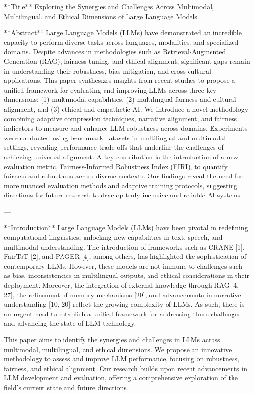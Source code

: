 **Title**  
Exploring the Synergies and Challenges Across Multimodal, Multilingual, and Ethical Dimensions of Large Language Models  

**Abstract**  
Large Language Models (LLMs) have demonstrated an incredible capacity to perform diverse tasks across languages, modalities, and specialized domains. Despite advances in methodologies such as Retrieval-Augmented Generation (RAG), fairness tuning, and ethical alignment, significant gaps remain in understanding their robustness, bias mitigation, and cross-cultural applications. This paper synthesizes insights from recent studies to propose a unified framework for evaluating and improving LLMs across three key dimensions: (1) multimodal capabilities, (2) multilingual fairness and cultural alignment, and (3) ethical and empathetic AI. We introduce a novel methodology combining adaptive compression techniques, narrative alignment, and fairness indicators to measure and enhance LLM robustness across domains. Experiments were conducted using benchmark datasets in multilingual and multimodal settings, revealing performance trade-offs that underline the challenges of achieving universal alignment. A key contribution is the introduction of a new evaluation metric, Fairness-Informed Robustness Index (FIRI), to quantify fairness and robustness across diverse contexts. Our findings reveal the need for more nuanced evaluation methods and adaptive training protocols, suggesting directions for future research to develop truly inclusive and reliable AI systems.

---

**Introduction**  
Large Language Models (LLMs) have been pivotal in redefining computational linguistics, unlocking new capabilities in text, speech, and multimodal understanding. The introduction of frameworks such as CRANE [1], FairToT [2], and PAGER [4], among others, has highlighted the sophistication of contemporary LLMs. However, these models are not immune to challenges such as bias, inconsistencies in multilingual outputs, and ethical considerations in their deployment. Moreover, the integration of external knowledge through RAG [4, 27], the refinement of memory mechanisms [29], and advancements in narrative understanding [10, 20] reflect the growing complexity of LLMs. As such, there is an urgent need to establish a unified framework for addressing these challenges and advancing the state of LLM technology.

This paper aims to identify the synergies and challenges in LLMs across multimodal, multilingual, and ethical dimensions. We propose an innovative methodology to assess and improve LLM performance, focusing on robustness, fairness, and ethical alignment. Our research builds upon recent advancements in LLM development and evaluation, offering a comprehensive exploration of the field's current state and future directions.

